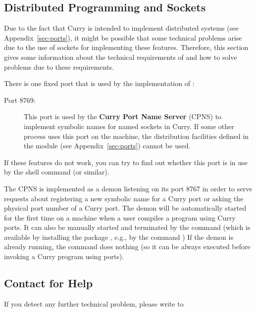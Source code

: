 \subsection{Distributed Programming and Sockets}

Due to the fact that Curry is intended to implement
distributed systems (see Appendix~\ref{sec-ports}),
it might be possible that some technical problems
arise due to the use of sockets for implementing these
features. Therefore, this section gives some information
about the technical requirements of \CYS and how to solve
problems due to these requirements.

There is one fixed port that is used by the implementation of \CYS:
\begin{description}
\item[Port 8769:] This port is used by the
{\bf Curry Port Name Server} (CPNS) to implement symbolic names for
named sockets in Curry.
If some other process uses this port on the machine,
the distribution facilities defined in the module 
(see Appendix~\ref{sec-ports}) cannot be used.
\end{description}
If these features do not work, you can try to find out
whether this port is in use by the shell command
 (or similar).

The CPNS is implemented as a demon listening on its port 8767
in order to serve requests about registering a new symbolic
name for a Curry port or asking the physical port number
of a Curry port. The demon will be automatically started for
the first time on a machine when a user compiles a program
using Curry ports.
It can also be manually started and terminated by the
command  (which is available by installing
the package , e.g., by the command )
If the demon is already running,
the command 
does nothing (so it can be always executed
before invoking a Curry program using ports).

\subsection{Contact for Help}

If you detect any further technical problem,
please write to
\begin{center}
\end{center}

